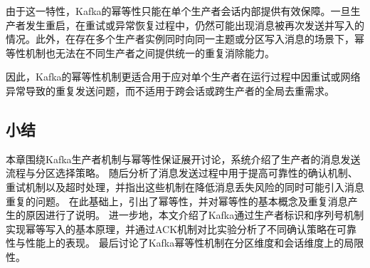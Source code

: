 由于这一特性，Kafka的幂等性只能在单个生产者会话内部提供有效保障。一旦生产者发生重启，在重试或异常恢复过程中，仍然可能出现消息被再次发送并写入的情况。此外，在存在多个生产者实例同时向同一主题或分区写入消息的场景下，幂等性机制也无法在不同生产者之间提供统一的重复消除能力。

因此，Kafka的幂等性机制更适合用于应对单个生产者在运行过程中因重试或网络异常导致的重复发送问题，而不适用于跨会话或跨生产者的全局去重需求。
\subsection{小结}
本章围绕Kafka生产者机制与幂等性保证展开讨论，系统介绍了生产者的消息发送流程与分区选择策略。
随后分析了消息发送过程中用于提高可靠性的确认机制、重试机制以及超时处理，并指出这些机制在降低消息丢失风险的同时可能引入消息重复的问题。
在此基础上，引出了幂等性，并对幂等性的基本概念及重复消息产生的原因进行了说明。
进一步地，本文介绍了Kafka通过生产者标识和序列号机制实现幂等写入的基本原理，并通过ACK机制对比实验分析了不同确认策略在可靠性与性能上的表现。
最后讨论了Kafka幂等性机制在分区维度和会话维度上的局限性。